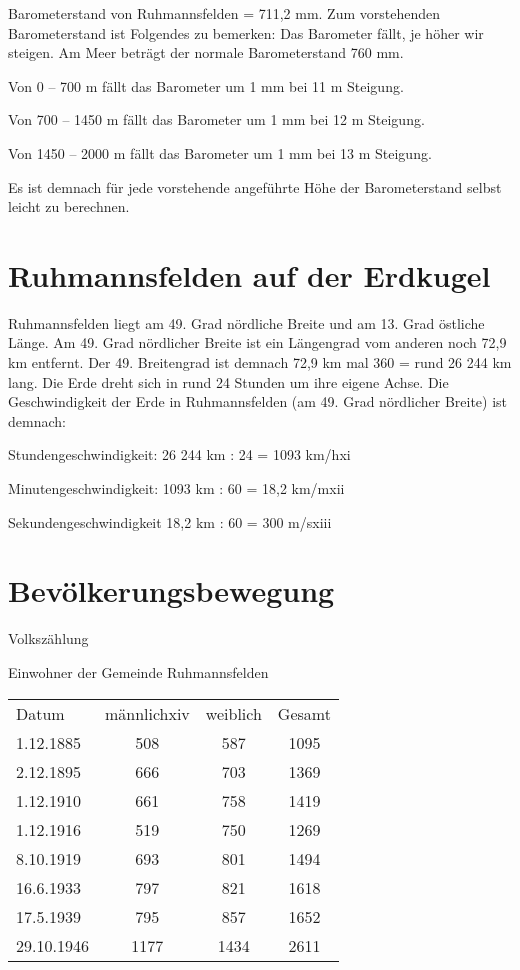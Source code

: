 \documentclass[12pt,a4paper]{book}
\begin{document}
Barometerstand von Ruhmannsfelden = 711,2 mm. Zum vorstehenden Barometerstand
ist Folgendes zu bemerken: Das Barometer fällt, je höher wir steigen. Am Meer
beträgt der normale Barometerstand 760 mm.

Von 0 – 700 m fällt das Barometer um 1 mm bei 11 m Steigung.

Von 700 – 1450 m fällt das Barometer um 1 mm bei 12 m Steigung.

Von 1450 – 2000 m fällt das Barometer um 1 mm bei 13 m Steigung.

Es ist demnach für jede vorstehende angeführte Höhe der Barometerstand selbst
leicht zu berechnen.

\chapter{Ruhmannsfelden auf der Erdkugel}

Ruhmannsfelden liegt am 49. Grad nördliche Breite und am 13. Grad östliche
Länge. Am 49. Grad nördlicher Breite ist ein Längengrad vom anderen noch 72,9 km
entfernt. Der 49. Breitengrad ist demnach 72,9 km mal 360 = rund 26 244 km lang.
Die Erde dreht sich in rund 24 Stunden um ihre eigene Achse. Die Geschwindigkeit
der Erde in Ruhmannsfelden (am 49. Grad nördlicher Breite) ist demnach:

Stundengeschwindigkeit: 26 244 km : 24 = 1093 km/hxi

Minutengeschwindigkeit: 1093 km : 60 = 18,2 km/mxii

Sekundengeschwindigkeit 18,2 km : 60 = 300 m/sxiii

\chapter{Bevölkerungsbewegung}

Volkszählung

Einwohner der Gemeinde Ruhmannsfelden
\begin{longtable}{l|ccc}
  Datum & männlichxiv & weiblich & Gesamt \\
  1.12.1885 & 508 & 587 & 1095 \\
  2.12.1895 & 666 & 703 & 1369 \\
  1.12.1910 & 661 & 758 & 1419 \\
  1.12.1916 & 519 & 750 & 1269 \\
  8.10.1919 & 693 & 801 & 1494 \\
  16.6.1933 & 797 & 821 & 1618 \\
  17.5.1939 & 795 & 857 & 1652 \\
  29.10.1946 & 1177 & 1434 & 2611 \\
\end{longtable}
\end{document}
